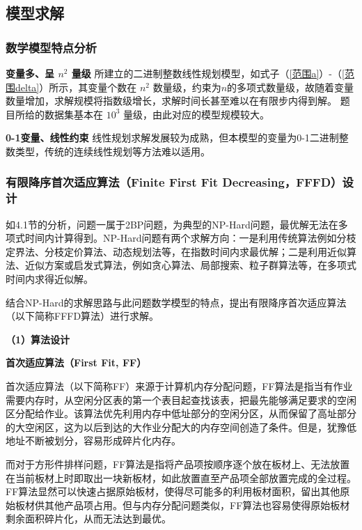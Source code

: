 \documentclass[bwprint]{gmcmthesis}
\begin{document}
\subsection{模型求解}
	
\subsubsection{数学模型特点分析}

	\textbf{变量多、呈 $ n^2 $ 量级} \quad 所建立的二进制整数线性规划模型，如式子（\ref{范围a}）-（\ref{范围delta}）所示，其变量个数在 $ n^2 $ 数量级，约束为$ n $的多项式数量级，故随着变量数量增加，求解规模将指数级增长，求解时间长甚至难以在有限步内得到解。 题目所给的数据集基本在 $ 10^3 $ 量级，由此对应的模型规模较大。
	
	\textbf{0-1变量、线性约束} \quad 线性规划求解发展较为成熟，但本模型的变量为0-1二进制整数类型，传统的连续线性规划等方法难以适用。
	

\subsubsection{有限降序首次适应算法（Finite First Fit Decreasing，FFFD）设计}
	
	如4.1节的分析，问题一属于2BP问题，为典型的NP-Hard问题，最优解无法在多项式时间内计算得到。NP-Hard问题有两个求解方向：一是利用传统算法例如分枝定界法、分枝定价算法、动态规划法等，在指数时间内求最优解；二是利用近似算法、近似方案或启发式算法，例如贪心算法、局部搜索、粒子群算法等，在多项式时间内求得近似解。
	
	结合NP-Hard的求解思路与此问题数学模型的特点，提出有限降序首次适应算法（以下简称FFFD算法）进行求解。
	
	\textbf{（1）算法设计}	
	
    \textbf{首次适应算法（First Fit, FF）}	

    首次适应算法（以下简称FF）来源于计算机内存分配问题，FF算法是指当有作业需要内存时，从空闲分区表的第一个表目起查找该表，把最先能够满足要求的空闲区分配给作业。该算法优先利用内存中低址部分的空闲分区，从而保留了高址部分的大空闲区，这为以后到达的大作业分配大的内存空间创造了条件。但是，犹豫低地址不断被划分，容易形成碎片化内存。

    而对于方形件排样问题，FF算法是指将产品项按顺序逐个放在板材上、无法放置在当前板材上时即取出一块新板材，如此放置直至产品项全部放置完成的全过程。FF算法显然可以快速占据原始板材，使得尽可能多的利用板材面积，留出其他原始板材供其他产品项占用。但与内存分配问题类似，FF算法也容易使得原始板材剩余面积碎片化，从而无法达到最优。
\end{document}
